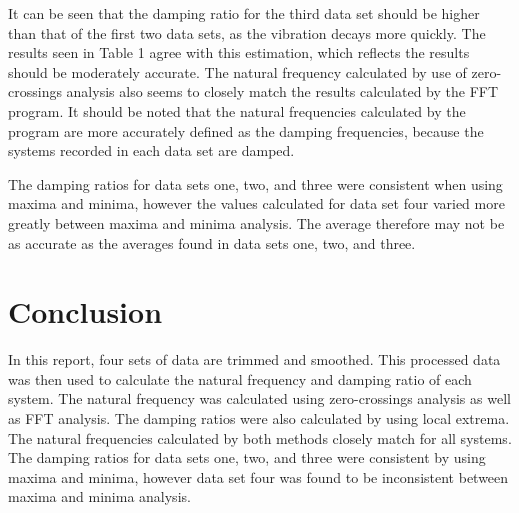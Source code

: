 \documentclass[11pt]{article}
\begin{document}
It can be seen that the damping ratio for the third data set should be higher than that of the first two data sets, as the vibration decays more quickly. The results seen in Table 1 agree with this estimation, which reflects the results should be moderately accurate. The natural frequency calculated by use of zero-crossings analysis also seems to closely match the results calculated by the FFT program. It should be noted that the natural frequencies calculated by the program are more accurately defined as the damping frequencies, because the systems recorded in each data set are damped.
\bigskip

The damping ratios for data sets one, two, and three were consistent when using maxima and minima, however the values calculated for data set four varied more greatly between maxima and minima analysis. The average therefore may not be as accurate as the averages found in data sets one, two, and three.
\bigskip


\section{Conclusion}
\label{sec:conclusion}
\vspace{-0.2in}
In this report, four sets of data are trimmed and smoothed. This processed data was then used to calculate the natural frequency and damping ratio of each system. The natural frequency was calculated using zero-crossings analysis as well as FFT analysis. The damping ratios were also calculated by using local extrema. The natural frequencies calculated by both methods closely match for all systems. The damping ratios for data sets one, two, and three were consistent by using maxima and minima, however data set four was found to be inconsistent between maxima and minima analysis.
\end{document}
